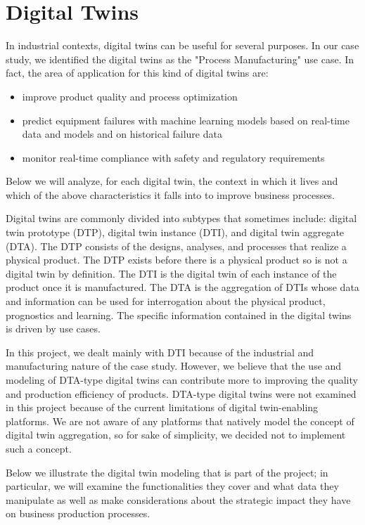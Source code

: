 \chapter{Digital Twins}
In industrial contexts, digital twins can be useful for several purposes.
In our case study, we identified the digital twins as the "Process Manufacturing" use case.
In fact, the area of application for this kind of digital twins are:
\begin{itemize}
	\item improve product quality and process optimization
	\item predict equipment failures with machine learning models based on real-time data and models and on historical failure data
	\item monitor real-time compliance with safety and regulatory requirements
\end{itemize}
Below we will analyze, for each digital twin, the context in which it lives and which of the above characteristics it falls into to improve business processes.

Digital twins are commonly divided into subtypes that sometimes include: digital twin prototype (DTP), digital twin instance (DTI), and digital twin aggregate (DTA).
The DTP consists of the designs, analyses, and processes that realize a physical product.
The DTP exists before there is a physical product so is not a digital twin by definition.
The DTI is the digital twin of each instance of the product once it is manufactured.
The DTA is the aggregation of DTIs whose data and information can be used for interrogation about the physical product, prognostics and learning.
The specific information contained in the digital twins is driven by use cases.

In this project, we dealt mainly with DTI because of the industrial and manufacturing nature of the case study.
However, we believe that the use and modeling of DTA-type digital twins can contribute more to improving the quality and production efficiency of products.
DTA-type digital twins were not examined in this project because of the current limitations of digital twin-enabling platforms.
We are not aware of any platforms that natively model the concept of digital twin aggregation, so for sake of simplicity, we decided not to implement such a concept.

Below we illustrate the digital twin modeling that is part of the project; in particular, we will examine the functionalities they cover and what data they
manipulate as well as make considerations about the strategic impact they have on business production processes.

